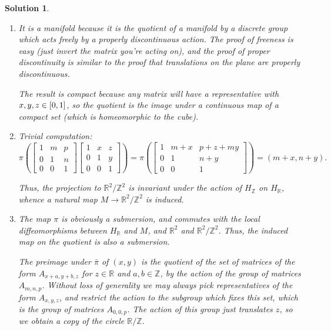 \documentclass{article}
\theoremstyle{plain}
\theoremstyle{nonumberplain}
\newtheorem{sol}{Solution}
\newcommand{\R}{\mathbb{R}}
\newcommand{\Z}{\mathbb{Z}}
\begin{document}
\begin{sol}
\leavevmode
\begin{enumerate}
\item It is a manifold because it is the quotient of a manifold by a discrete group which acts freely by a properly discontinuous action. The proof of freeness is easy (just invert the matrix you're acting on), and the proof of proper discontinuity is similar to the proof that translations on the plane are properly discontinuous.

The result is compact because any matrix will have a representative with $x,y,z \in \interval01$, so the quotient is the image under a continuous map of a compact set (which is homeomorphic to the cube).

\item Trivial computation:
\begin{equation}
\pi\left(\begin{bmatrix}
1 & m & p\\
0 & 1 & n\\
0 & 0 & 1
\end{bmatrix}
\begin{bmatrix}
1 & x & z\\
0 & 1 & y\\
0 & 0 & 1
\end{bmatrix} \right) = \pi\left(\begin{bmatrix}
1 & m+x & p + z + my\\
0 & 1 & n+y\\
0 & 0 & 1
\end{bmatrix}\right) = (m+x,n+y).
\end{equation}

Thus, the projection to $\R^2 / \Z^2$ is invariant under the action of $H_\Z$ on $H_\R$, whence a natural map $M \to \R^2/\Z^2$ is induced.

\item The map $\pi$ is obviously a submersion, and commutes with the local diffeomorphisms between $H_\R$ and $M$, and $\R^2$ and $\R^2/\Z^2$. Thus, the induced map on the quotient is also a submersion.

The preimage under $\bar \pi$ of $(x,y)$ is the quotient of the set of matrices of the form $A_{x+a,y+b,z}$ for $z \in \R$ and $a,b \in \Z$, by the action of the group of matrices $A_{m,n,p}$. Without loss of generality we may always pick representatives of the form $A_{x,y,z}$, and restrict the action to the subgroup which fixes this set, which is the group of matrices $A_{0,0,p}$. The action of this group just translates $z$, so we obtain a copy of the circle $\R/\Z$.


\end{enumerate}
\end{sol}
\end{document}
